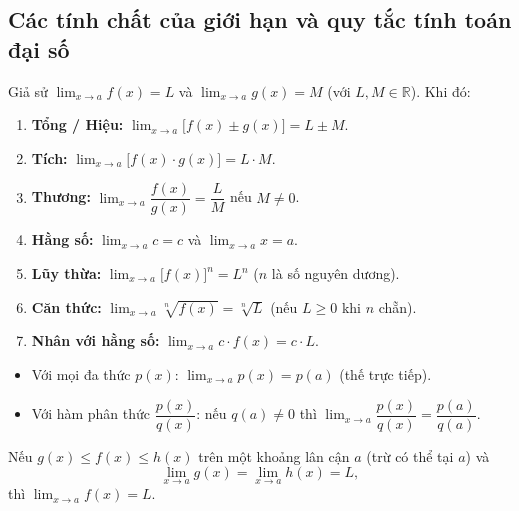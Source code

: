 \documentclass[12pt,a4paper]{article}
\begin{document}
\subsection{Các tính chất của giới hạn và quy tắc tính toán đại số}

\begin{tinhchat}[title={Các quy tắc giới hạn (Limit Laws)}]
  Giả sử $\displaystyle\lim_{x \to a} f(x) = L$ và $\displaystyle\lim_{x \to a} g(x) = M$ (với $L, M \in \mathbb{R}$). Khi đó:
  \begin{enumerate}
    \item \textbf{Tổng / Hiệu:} $\displaystyle\lim_{x \to a} \bigl[f(x) \pm g(x)\bigr] = L \pm M$.
    \item \textbf{Tích:} $\displaystyle\lim_{x \to a} \bigl[f(x) \cdot g(x)\bigr] = L \cdot M$.
    \item \textbf{Thương:} $\displaystyle\lim_{x \to a} \dfrac{f(x)}{g(x)} = \dfrac{L}{M}$\; nếu $M \ne 0$.
    \item \textbf{Hằng số:} $\displaystyle\lim_{x \to a} c = c$ và $\displaystyle\lim_{x \to a} x = a$.
    \item \textbf{Lũy thừa:} $\displaystyle\lim_{x \to a} \bigl[f(x)\bigr]^n = L^n$ ($n$ là số nguyên dương).
    \item \textbf{Căn thức:} $\displaystyle\lim_{x \to a} \sqrt[n]{f(x)} = \sqrt[n]{L}$\; (nếu $L \ge 0$ khi $n$ chẵn).
    \item \textbf{Nhân với hằng số:} $\displaystyle\lim_{x \to a} c \cdot f(x) = c \cdot L$.
  \end{enumerate}
\end{tinhchat}

\begin{dinhly}[title={Giới hạn của hàm đa thức và phân thức}]
  \begin{itemize}
    \item Với mọi đa thức $p(x)$: $\displaystyle\lim_{x \to a} p(x) = p(a)$ (thế trực tiếp).
    \item Với hàm phân thức $\dfrac{p(x)}{q(x)}$: nếu $q(a) \ne 0$ thì $\displaystyle\lim_{x \to a} \dfrac{p(x)}{q(x)} = \dfrac{p(a)}{q(a)}$.
  \end{itemize}
\end{dinhly}

\begin{dinhly}[title={Định lý kẹp (Squeeze Theorem)}]
  Nếu $g(x) \le f(x) \le h(x)$ trên một khoảng lân cận $a$ (trừ có thể tại $a$) và
  \[
    \lim_{x \to a} g(x) = \lim_{x \to a} h(x) = L,
  \]
  thì $\displaystyle\lim_{x \to a} f(x) = L$.
\end{dinhly}
\end{document}
